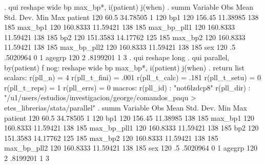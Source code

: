 . qui reshape wide bp max_bp*, i(patient) j(when)
{\smallskip}
. summ 
{\smallskip}
    Variable {\VBAR}       Obs        Mean    Std. Dev.       Min        Max
     patient {\VBAR}       120        60.5    34.78505          1        120
         bp1 {\VBAR}       120      156.45    11.38985        138        185
     max_bp1 {\VBAR}       120    160.8333    11.59421        138        185
 max_bp_pll1 {\VBAR}       120    160.8333    11.59421        138        185
         bp2 {\VBAR}       120    151.3583    14.17762        125        185
     max_bp2 {\VBAR}       120    160.8333    11.59421        138        185
 max_bp_pll2 {\VBAR}       120    160.8333    11.59421        138        185
         sex {\VBAR}       120          .5    .5020964          0          1
      agegrp {\VBAR}       120           2    .8199201          1          3
{\smallskip}
. qui reshape long
{\smallskip}
. qui parallel, by(patient) f nog: reshape wide bp max_bp*, i(patient) j(when)
{\smallskip}
. return list
{\smallskip}
scalars:
              r(pll_n) =  4
         r(pll_t_fini) =  .001
         r(pll_t_calc) =  .181
         r(pll_t_setu) =  0
         r(pll_t_reps) =  1
           r(pll_errs) =  0
{\smallskip}
macros:
             r(pll_id) : "not6lzdcp8"
            r(pll_dir) : "/u1/users/estudios/investigacion/george/comandos_paqu
> etes_librerias/stata/parallel"
{\smallskip}
. summ
{\smallskip}
    Variable {\VBAR}       Obs        Mean    Std. Dev.       Min        Max
     patient {\VBAR}       120        60.5    34.78505          1        120
         bp1 {\VBAR}       120      156.45    11.38985        138        185
     max_bp1 {\VBAR}       120    160.8333    11.59421        138        185
 max_bp_pll1 {\VBAR}       120    160.8333    11.59421        138        185
         bp2 {\VBAR}       120    151.3583    14.17762        125        185
     max_bp2 {\VBAR}       120    160.8333    11.59421        138        185
 max_bp_pll2 {\VBAR}       120    160.8333    11.59421        138        185
         sex {\VBAR}       120          .5    .5020964          0          1
      agegrp {\VBAR}       120           2    .8199201          1          3
{\smallskip}
